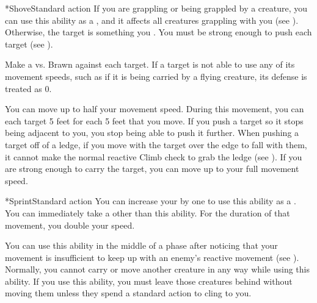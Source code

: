   \begin{activeability}*{Shove}{Standard action}
    \abilitytags {}
    \rankline
    If you are grappling or being grappled by a creature, you can use this ability as a , and it affects all creatures grappling with you (see ).
    Otherwise, the target is something you .
    You must be strong enough to push each target (see ).

    Make a  vs. Brawn against each target.
    If a target is not able to use any of its movement speeds, such as if it is being carried by a flying creature, its defense is treated as 0.

    \hit You can move up to half your movement speed.
    During this movement, you can  each target 5 feet for each 5 feet that you move.
    If you push a target so it stops being adjacent to you, you stop being able to push it further.
    When pushing a target off of a ledge, if you move with the target over the edge to fall with them, it cannot make the normal reactive Climb check to grab the ledge (see ).
    \crit If you are strong enough to carry the target, you can move up to your full movement speed.
  \end{activeability}

  \begin{activeability}*{Sprint}{Standard action}
    \abilitycost You can increase your  by one to use this ability as a .
    \rankline
    You can immediately take a  other than this ability.
    For the duration of that movement, you double your speed.

    You can use this ability in the middle of a phase after noticing that your movement is insufficient to keep up with an enemy's reactive movement (see ).
    Normally, you cannot carry or move another creature in any way while using this ability.
    If you use this ability, you must leave those creatures behind without moving them unless they spend a standard action to cling to you.
  \end{activeability}

